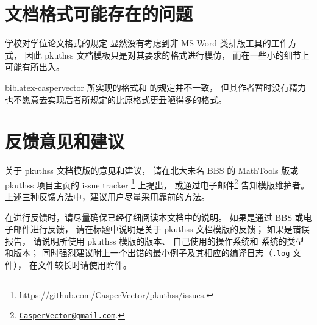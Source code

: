 	\section{文档格式可能存在的问题}

	学校对学位论文格式的规定\mbox{\supercite{pku-thesisstyle}}%
	显然没有考虑到非 MS Word 类排版工具的工作方式，
	因此 pkuthss 文档模板只是对其要求的格式进行模仿，
	而在一些小的细节上可能有所出入。

	biblatex-caspervector\supercite{biblatex-caspervector} 所实现的格式和 %
	\parencite{pku-thesisstyle} 的规定并不一致，
	但其作者暂时没有精力也不愿意去实现后者所规定的比原格式更丑陋得多的格式。

	\section{反馈意见和建议}

	关于 pkuthss 文档模版的意见和建议，
	请在北大未名 BBS 的 MathTools 版或 %
	pkuthss 项目主页的 issue tracker%
	\footnote{\url{https://github.com/CasperVector/pkuthss/issues}.}%
	上提出，
	或通过电子邮件\footnote%
	{\href{mailto:CasperVector@gmail.com}{\texttt{CasperVector@gmail.com}}.}%
	告知模版维护者。
	上述三种反馈方法中，建议用户尽量采用靠前的方法。

	在进行反馈时，请尽量确保已经仔细阅读本文档中的说明。
	如果是通过 BBS 或电子邮件进行反馈，
	请在标题中说明是关于 pkuthss 文档模版的反馈；
	如果是错误报告，
	请说明所使用 pkuthss 模版的版本、
	自己使用的操作系统和  系统的类型和版本；
	同时强烈建议附上一个出错的最小例子及其相应的编译日志（\verb|.log| 文件），
	在文件较长时请使用附件。

